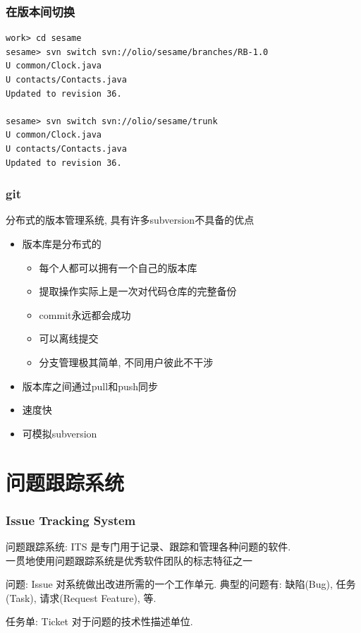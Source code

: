 \documentclass[compress]{beamer}
\begin{document}
\begin{frame}[containsverbatim]
  \frametitle{在版本间切换}
{\small
\begin{Verbatim}
work> cd sesame
sesame> svn switch svn://olio/sesame/branches/RB-1.0
U common/Clock.java
U contacts/Contacts.java
Updated to revision 36.

sesame> svn switch svn://olio/sesame/trunk
U common/Clock.java
U contacts/Contacts.java
Updated to revision 36.
\end{Verbatim}
}
  
\end{frame}

\begin{frame}
    \frametitle{git}
    分布式的版本管理系统, 具有许多subversion不具备的优点
    \begin{itemize}
        \item 版本库是分布式的
            \begin{itemize}
                \item 每个人都可以拥有一个自己的版本库
                \item 提取操作实际上是一次对代码仓库的完整备份
                \item commit永远都会成功
                \item 可以离线提交
                \item 分支管理极其简单, 不同用户彼此不干涉
            \end{itemize}
        \item 版本库之间通过pull和push同步
        \item 速度快
        \item 可模拟subversion
    \end{itemize}
\end{frame}

\section{问题跟踪系统}

\begin{frame}
    \frametitle{Issue Tracking System}

\begin{block}{问题跟踪系统: ITS}
是专门用于记录、跟踪和管理各种问题的软件.\\
一贯地使用问题跟踪系统是优秀软件团队的标志特征之一
\end{block}

\begin{block}{问题: Issue}
对系统做出改进所需的一个工作单元. 典型的问题有: 缺陷(Bug), 任务(Task),
请求(Request Feature), 等.
\end{block}

\begin{block}{任务单: Ticket}
对于问题的技术性描述单位.
\end{block}
\end{frame}
\end{document}
